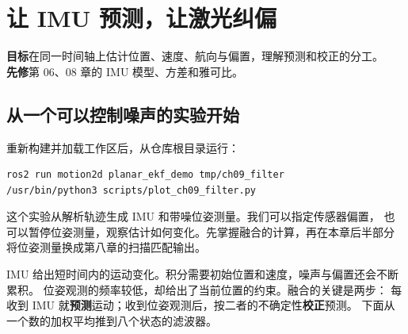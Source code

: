 \chapter{让 IMU 预测，让激光纠偏}
\begin{notebox}
\textbf{目标}\quad 在同一时间轴上估计位置、速度、航向与偏置，理解预测和校正的分工。\\
\textbf{先修}\quad 第 06、08 章的 IMU 模型、方差和雅可比。
\end{notebox}

\section{从一个可以控制噪声的实验开始}
重新构建并加载工作区后，从仓库根目录运行：
\begin{lstlisting}[language=bash,numbers=none]
ros2 run motion2d planar_ekf_demo tmp/ch09_filter
/usr/bin/python3 scripts/plot_ch09_filter.py
\end{lstlisting}
这个实验从解析轨迹生成 IMU 和带噪位姿测量。我们可以指定传感器偏置，
也可以暂停位姿测量，观察估计如何变化。先掌握融合的计算，再在本章后半部分
将位姿测量换成第八章的扫描匹配输出。

IMU 给出短时间内的运动变化。积分需要初始位置和速度，噪声与偏置还会不断累积。
位姿观测的频率较低，却给出了当前位置的约束。融合的关键是两步：
每收到 IMU 就\textbf{预测}运动；收到位姿观测后，按二者的不确定性\textbf{校正}预测。
下面从一个数的加权平均推到八个状态的滤波器。


